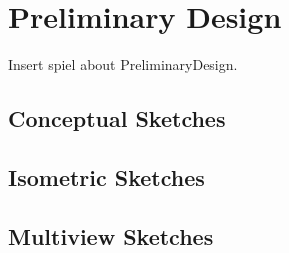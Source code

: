 

\chapter{Preliminary Design}

Insert spiel about PreliminaryDesign.

\section{Conceptual Sketches}


\section{Isometric Sketches}


\section{Multiview Sketches}

